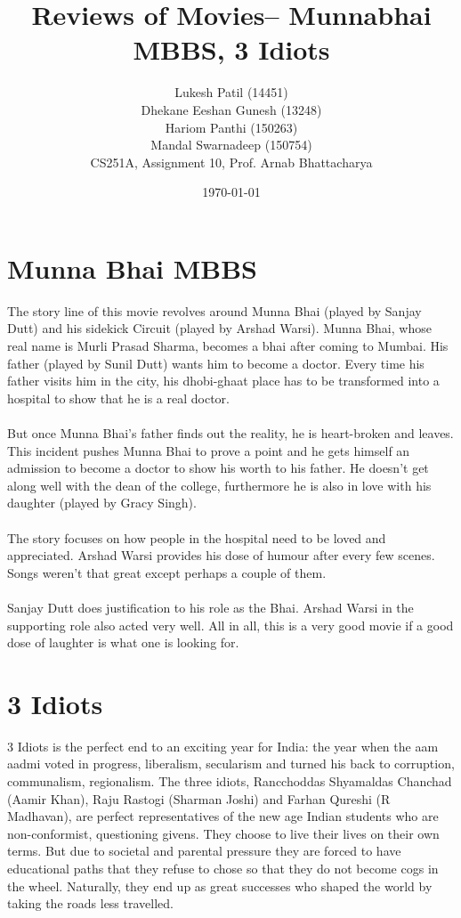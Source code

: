 \documentclass{article}
\author{Lukesh Patil (14451)\\ Dhekane Eeshan Gunesh (13248)\\ Hariom Panthi (150263)\\ Mandal Swarnadeep (150754)\\CS251A, Assignment 10, Prof. Arnab Bhattacharya}
\title{Reviews of Movies-- Munnabhai MBBS, 3 Idiots}
\date{\today}
\begin{document}
\maketitle

\section{Munna Bhai MBBS}
The story line of this movie revolves around Munna Bhai (played by Sanjay Dutt) and his sidekick Circuit (played by Arshad Warsi). Munna Bhai, whose real name is Murli Prasad Sharma, becomes a bhai after coming to Mumbai. His father (played by Sunil Dutt) wants him to become a doctor. Every time his father visits him in the city, his dhobi-ghaat place has to be transformed into a hospital to show that he is a real doctor. \\ \\

But once Munna Bhai's father finds out the reality, he is heart-broken and leaves. This incident pushes Munna Bhai to prove a point and he gets himself an admission to become a doctor to show his worth to his father. He doesn't get along well with the dean of the college, furthermore he is also in love with his daughter (played by Gracy Singh). \\ \\
The story focuses on how people in the hospital need to be loved and appreciated. Arshad Warsi provides his dose of humour after every few scenes. Songs weren't that great except perhaps a couple of them. \\ \\
Sanjay Dutt does justification to his role as the Bhai. Arshad Warsi in the supporting role also acted very well. All in all, this is a very good movie if a good dose of laughter is what one is looking for.


\section{3 Idiots}
3 Idiots is the perfect end to an exciting year for India: the year when the aam aadmi voted in progress, liberalism, secularism and turned his back to corruption, communalism, regionalism. The three idiots, Rancchoddas Shyamaldas Chanchad (Aamir Khan), Raju Rastogi (Sharman Joshi) and Farhan Qureshi (R Madhavan), are perfect representatives of the new age Indian students who are non-conformist, questioning givens. They choose to live their lives on their own terms. But due to societal and parental pressure they are forced to have educational paths that they refuse to chose so that they do not become cogs in the wheel. Naturally, they end up as great successes who shaped the world by taking the roads less travelled.\\
\end{document}
